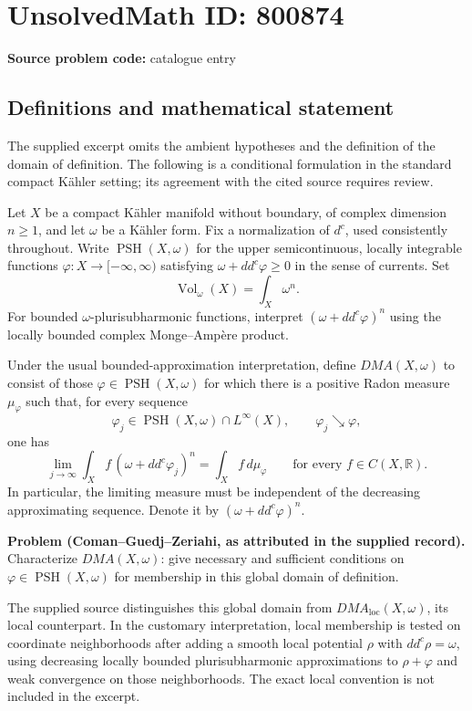 \documentclass[11pt]{article}
\newcommand{\R}{\mathbb{R}}
\begin{document}
\section*{UnsolvedMath ID: 800874}
\textbf{Source problem code:} catalogue entry
\subsection{Definitions and mathematical statement}
The supplied excerpt omits the ambient hypotheses and the definition of the domain of definition. The following is a conditional formulation in the standard compact K\"ahler setting; its agreement with the cited source requires review.

Let \(X\) be a compact K\"ahler manifold without boundary, of complex dimension \(n\geq 1\), and let \(\omega\) be a K\"ahler form. Fix a normalization of \(d^c\), used consistently throughout. Write \(\operatorname{PSH}(X,\omega)\) for the upper semicontinuous, locally integrable functions \(\varphi:X\to[-\infty,\infty)\) satisfying \(\omega+dd^c\varphi\geq0\) in the sense of currents. Set
\[
\operatorname{Vol}_{\omega}(X)=\int_X\omega^n.
\]
For bounded \(\omega\)-plurisubharmonic functions, interpret \((\omega+dd^c\varphi)^n\) using the locally bounded complex Monge--Amp\`ere product.

Under the usual bounded-approximation interpretation, define \(DMA(X,\omega)\) to consist of those \(\varphi\in\operatorname{PSH}(X,\omega)\) for which there is a positive Radon measure \(\mu_\varphi\) such that, for every sequence
\[
\varphi_j\in\operatorname{PSH}(X,\omega)\cap L^\infty(X),
\qquad \varphi_j\searrow\varphi,
\]
one has
\[
\lim_{j\to\infty}\int_X f\,(\omega+dd^c\varphi_j)^n
=\int_X f\,d\mu_\varphi
\qquad\text{for every }f\in C(X,\R).
\]
In particular, the limiting measure must be independent of the decreasing approximating sequence. Denote it by \((\omega+dd^c\varphi)^n\).

\textbf{Problem (Coman--Guedj--Zeriahi, as attributed in the supplied record).} Characterize \(DMA(X,\omega)\): give necessary and sufficient conditions on \(\varphi\in\operatorname{PSH}(X,\omega)\) for membership in this global domain of definition.

The supplied source distinguishes this global domain from \(DMA_{\mathrm{loc}}(X,\omega)\), its local counterpart. In the customary interpretation, local membership is tested on coordinate neighborhoods after adding a smooth local potential \(\rho\) with \(dd^c\rho=\omega\), using decreasing locally bounded plurisubharmonic approximations to \(\rho+\varphi\) and weak convergence on those neighborhoods. The exact local convention is not included in the excerpt.
\end{document}
